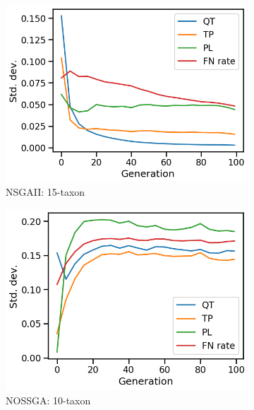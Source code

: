\begin{figure}[!htbp]
\begin{adjustwidth}{-1cm}{-1cm}
\begin{subfigure}[b]{0.4\textwidth}
			\includegraphics[width=\textwidth]{Figure/15-taxon_NSGAII_std_dev}
			\caption{NSGAII: 15-taxon}
		\end{subfigure}
		\begin{subfigure}[b]{0.4\textwidth}
			\includegraphics[width=\textwidth]{Figure/10-taxon_NOSSGA_std_dev}
			\caption{NOSSGA: 10-taxon}
		\end{subfigure}%
		\begin{subfigure}[b]{0.4\textwidth}

\end{subfigure}
\end{adjustwidth}
\end{figure}
